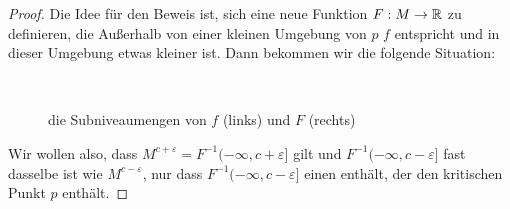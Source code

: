 \begin{proof}
    Die Idee für den Beweis ist, sich eine neue Funktion $F: M \to { \mathbb R }$ zu definieren,
    die Außerhalb von einer kleinen Umgebung von $p$ $f$ entspricht und in dieser 
    Umgebung etwas kleiner ist. Dann bekommen wir die folgende Situation:

    \begin{figure}[H]
        \centering
         \\
        \caption{die Subniveaumengen von $f$ (links) und $F$ (rechts)}
    \end{figure}

    Wir wollen also, dass $M^{c + \varepsilon} = F^{-1}(- \infty, c + \varepsilon]$ 
    gilt und $F^{-1}(-\infty, c - \varepsilon]$ fast dasselbe ist wie 
    $M^{c - \varepsilon}$, nur dass $F^{-1}(-\infty, c - \varepsilon]$ einen 
    enthält, der den kritischen Punkt $p$ enthält.


\end{proof}
